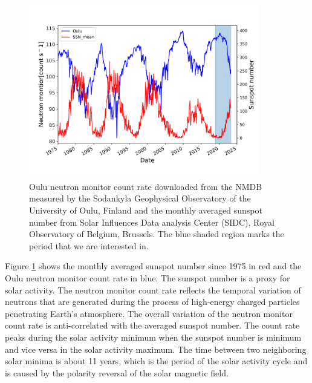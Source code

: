 \begin{figure}[!htb]
    \centering
    \includegraphics[width = 0.9\textwidth]{images/Solar_modulation.png}
    \caption[Sunspot number and Neutron monitor count data]{Oulu neutron monitor count rate downloaded from the \ac{NMDB} measured by the Sodankyla Geophysical Observatory of the University of Oulu, Finland and the monthly averaged sunspot number from Solar Influences Data analysis Center (SIDC), Royal Observatory of Belgium, Brussels. The blue shaded region marks the period that we are interested in.}
    \label{Fig:Solar_modulation}
\end{figure}


Figure \ref{Fig:Solar_modulation} shows the monthly averaged sunspot number since 1975 in red and the Oulu neutron monitor count rate in blue.
The sunspot number is a proxy for solar activity. 
The neutron monitor count rate reflects the temporal variation of neutrons that are generated during the process of high-energy charged particles penetrating Earth's atmosphere. 
The overall variation of the neutron monitor count rate is anti-correlated with the averaged sunspot number.
The count rate peaks during the solar activity minimum when the sunspot number is minimum and vice versa in the solar activity maximum. The time between two neighboring solar minima is about 11 years, which is the period of the solar activity cycle and is caused by the polarity reversal of the solar magnetic field.


